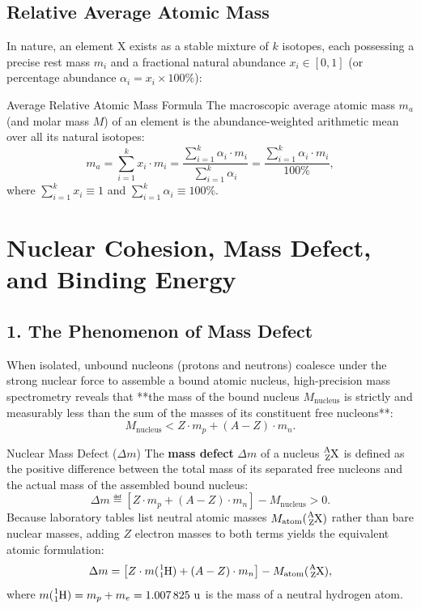 \subsection{Relative Average Atomic Mass}
In nature, an element $\mathrm{X}$ exists as a stable mixture of $k$ isotopes, each possessing a precise rest mass $m_i$ and a fractional natural abundance $x_i \in [0, 1]$ (or percentage abundance $\alpha_i = x_i \times 100\%$):

\begin{lawbox}{Average Relative Atomic Mass Formula}
The macroscopic average atomic mass $m_a$ (and molar mass $M$) of an element is the abundance-weighted arithmetic mean over all its natural isotopes:
\begin{equation}
m_a = \sum_{i=1}^k x_i \cdot m_i = \frac{\sum_{i=1}^k \alpha_i \cdot m_i}{\sum_{i=1}^k \alpha_i} = \frac{\sum_{i=1}^k \alpha_i \cdot m_i}{100\%},
\end{equation}
where $\sum_{i=1}^k x_i \equiv 1$ and $\sum_{i=1}^k \alpha_i \equiv 100\%$.
\end{lawbox}

\section{Nuclear Cohesion, Mass Defect, and Binding Energy}

\subsection{1. The Phenomenon of Mass Defect}
When isolated, unbound nucleons (protons and neutrons) coalesce under the strong nuclear force to assemble a bound atomic nucleus, high-precision mass spectrometry reveals that **the mass of the bound nucleus $M_{\text{nucleus}}$ is strictly and measurably less than the sum of the masses of its constituent free nucleons**:
\begin{equation}
M_{\text{nucleus}} < Z \cdot m_p + (A - Z) \cdot m_n.
\end{equation}

\begin{definitionbox}{Nuclear Mass Defect ($\Delta m$)}
The \textbf{mass defect} $\Delta m$ of a nucleus $\ce{^{A}_{Z}X}$ is defined as the positive difference between the total mass of its separated free nucleons and the actual mass of the assembled bound nucleus:
\begin{equation}
\Delta m \eqdef \left[ Z \cdot m_p + (A - Z) \cdot m_n \right] - M_{\text{nucleus}} > 0.
\end{equation}
Because laboratory tables list neutral atomic masses $M_{\text{atom}}(\ce{^{A}_{Z}X})$ rather than bare nuclear masses, adding $Z$ electron masses to both terms yields the equivalent atomic formulation:
\begin{equation}
\Delta m = \left[ Z \cdot m(\ce{^1_1H}) + (A - Z) \cdot m_n \right] - M_{\text{atom}}(\ce{^{A}_{Z}X}),
\end{equation}
where $m(\ce{^1_1H}) = m_p + m_e = 1.007\,825\ \mathrm{u}$ is the mass of a neutral hydrogen atom.
\end{definitionbox}

